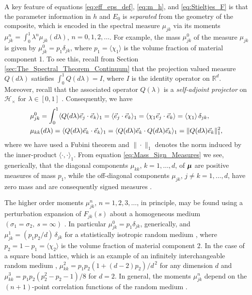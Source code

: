 \documentclass{cmslatex}
\newcommand\bmu{\mbox{\boldmath${\mu}$}}
\begin{document}
A key feature of equations \eqref{eq:eff_eps_def}, \eqref{eq:m_h}, and
\eqref{eq:Stieltjes_F} is that the parameter information in $h$ and
$E_0$ is \emph{separated} from the geometry of the composite, which is
encoded in the spectral measure $\mu_{jk}$ via its moments 
$\mu_{jk}^n=\int_0^1\lambda^n\mu_{jk}(d\lambda)$, $n=0,1,2,\ldots$. For example, the mass
$\mu_{jk}^0$ of the measure $\mu_{jk}$ is given by $\mu_{jk}^0=p_1\delta_{jk}$,
where $p_1=\langle\chi_1\rangle$ is the volume fraction of material component 1.  To
see this, recall from Section \ref{sec:The_Spectral_Theorem_Continuum}
that the projection valued measure $Q(d\lambda)$ satisfies
$\int_0^1Q(d\lambda)=I$, where $I$ is the identity operator on
$\mathbb{R}^d$. Moreover, recall that the associated operator $Q(\lambda)$ 
is a \emph{self-adjoint projector} on $\mathscr{H}_\times$ for $\lambda\in[0,1]$
\cite{Reed-1980,Stone:64}. Consequently, 
we have 
% 
\begin{align}\label{eq:Mass_Sign_Measures}
   &\mu_{jk}^0%
         =\int_0^1\langle Q(d\lambda)\vec{e}_j\cdot\vec{e}_k\rangle_1
        =\langle\vec{e}_j\cdot\vec{e}_k\rangle_1
        =\langle\chi_1\vec{e}_j\cdot\vec{e}_k\rangle
        =\langle\chi_1\rangle\,\delta_{jk},\\
   &\mu_{kk}(d\lambda)=\langle Q(d\lambda)\vec{e}_k\cdot\vec{e}_k\rangle_1
       =\langle Q(d\lambda)\vec{e}_k\cdot Q(d\lambda)\vec{e}_k\rangle_1
       =\|Q(d\lambda)\vec{e}_k\|_1^2,\notag
\end{align}
%
where we have used a Fubini theorem \cite{Folland:99}
and $\|\cdot\|_1$ denotes the norm induced by the inner-product
$\langle\cdot,\cdot\rangle_1$. From equation \eqref{eq:Mass_Sign_Measures} we see,
generically, that the diagonal components $\mu_{kk}$, $k=1,\ldots,d$, of
$\bmu$ are positive measures of mass $p_1$, while the off-diagonal
components $\mu_{jk}$, $j\neq k=1,\ldots,d$, have zero mass and are consequently
signed measures \cite{Folland:99,Rudin:87}.



The higher order moments $\mu_{jk}^n$, $n=1,2,3,\ldots$, in principle, may be
found using a perturbation expansion of $F_{jk}(s)$ about a
homogeneous medium $(\sigma_1=\sigma_2, \ s=\infty)$ \cite{Golden:CMP-473}. In
particular $\mu_{jk}^0=p_1\delta_{jk}$, generically, and $\mu_{jk}^1=(p_1p_2/d)\,\delta_{jk}$
for a statistically isotropic random medium 
\cite{Golden:CMP-473,Golden:IMA-97,Bruno:JSP-365}, where
$p_2=1-p_1=\langle\chi_2\rangle$ is the volume fraction of material component 2. In
the case of a square bond lattice, which is an example of an
infinitely interchangeable random medium \cite{Bruno:JSP-365},
$\mu_{kk}^2=p_1p_2(1+(d-2)p_2)/d^{\,2}$ for any dimension $d$ and
$\mu_{kk}^3=p_1p_2(p_2^2-p_2-1)/8$ for $d=2$. In general, the moments
$\mu_{jk}^n$ depend on the $(n+1)$-point correlation functions of the
random medium \cite{Golden:CMP-473,Bruno:JSP-365}.
\end{document}
